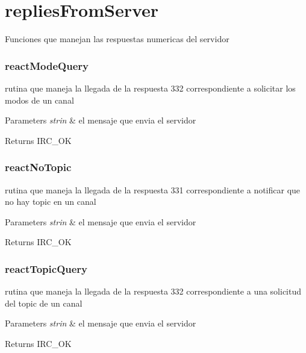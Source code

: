 \hypertarget{group___i_r_creplies_from_server}{\section{replies\-From\-Server}
\label{group___i_r_creplies_from_server}
}
Funciones que manejan las respuestas numericas del servidor



 \hypertarget{reactModeQuery}{}\subsubsection{react\-Mode\-Query}\label{reactModeQuery}
rutina que maneja la llegada de la respuesta 332 correspondiente a solicitar los modos de un canal


\begin{DoxyParams}{Parameters}
{\em strin} & el mensaje que envia el servidor\\
\hline
\end{DoxyParams}
\begin{DoxyReturn}{Returns}
I\-R\-C\-\_\-\-O\-K
\end{DoxyReturn}


 \hypertarget{reactNoTopic}{}\subsubsection{react\-No\-Topic}\label{reactNoTopic}
rutina que maneja la llegada de la respuesta 331 correspondiente a notificar que no hay topic en un canal


\begin{DoxyParams}{Parameters}
{\em strin} & el mensaje que envia el servidor\\
\hline
\end{DoxyParams}
\begin{DoxyReturn}{Returns}
I\-R\-C\-\_\-\-O\-K
\end{DoxyReturn}


 \hypertarget{reactTopicQuery}{}\subsubsection{react\-Topic\-Query}\label{reactTopicQuery}
rutina que maneja la llegada de la respuesta 332 correspondiente a una solicitud del topic de un canal


\begin{DoxyParams}{Parameters}
{\em strin} & el mensaje que envia el servidor\\
\hline
\end{DoxyParams}
\begin{DoxyReturn}{Returns}
I\-R\-C\-\_\-\-O\-K
\end{DoxyReturn}


